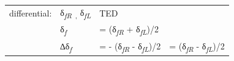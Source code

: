 \documentclass[
]{book}
\begin{document}
\begin{longtable}[]{@{}llll@{}}
\begin{minipage}[t]{0.27\columnwidth}
differential:\strut
\end{minipage} & \begin{minipage}[t]{0.17\columnwidth}\raggedright
δ\textsubscript{\emph{fR}~,} δ\emph{\textsubscript{fL}}\strut
\end{minipage} & \begin{minipage}[t]{0.22\columnwidth}\raggedright
TED\strut
\end{minipage} & \begin{minipage}[t]{0.22\columnwidth}\raggedright
\strut
\end{minipage}\tabularnewline
\begin{minipage}[t]{0.27\columnwidth}\raggedright
\strut
\end{minipage} & \begin{minipage}[t]{0.17\columnwidth}\raggedright
δ\emph{\textsubscript{f}}\strut
\end{minipage} & \begin{minipage}[t]{0.22\columnwidth}\raggedright
= (δ\emph{\textsubscript{fR}} + δ\emph{\textsubscript{fL}})/2\strut
\end{minipage} & \begin{minipage}[t]{0.22\columnwidth}\raggedright
\strut
\end{minipage}\tabularnewline
\begin{minipage}[t]{0.27\columnwidth}\raggedright
\strut
\end{minipage} & \begin{minipage}[t]{0.17\columnwidth}\raggedright
∆δ\emph{\textsubscript{f}}\strut
\end{minipage} & \begin{minipage}[t]{0.22\columnwidth}\raggedright
= - (δ\emph{\textsubscript{fR}} - δ\emph{\textsubscript{fL}})/2\strut
\end{minipage} & \begin{minipage}[t]{0.22\columnwidth}\raggedright
= (δ\emph{\textsubscript{fR}} - δ\emph{\textsubscript{fL}})/2\strut
\end{minipage}\tabularnewline
\bottomrule
\end{longtable}
\end{document}
